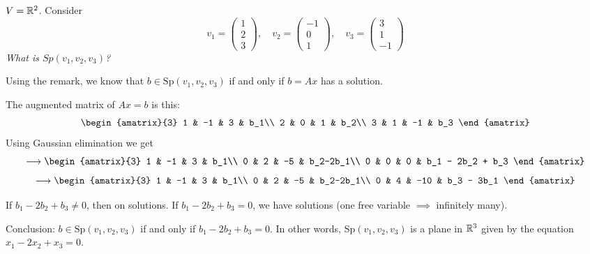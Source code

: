 \documentclass[10pt]{scrartcl}
\begin{document}
\begin{example}
$V = \mathbb{R}^2$. Consider 
\[
  v_1 = \begin{pmatrix}
 1 \\ 2 \\ 3	
 \end{pmatrix},\quad 
 v_2 = \begin{pmatrix}
 -1 \\ 0 \\ 1	
 \end{pmatrix},\quad 
 v_3 = \begin{pmatrix}
 3 \\ 1 \\ -1	
 \end{pmatrix}
\]
\emph{What is $Sp(v_1,v_2,v_3)$?}

Using the remark, we know that $b \in \mathrm{Sp}(v_1,v_2,v_3)$ if and only if $b = Ax$ has a solution. 

The augmented matrix of $Ax = b$ is this: 
\[
\begin{amatrix}{3}
  1 & -1 & 	3 & b_1\\
  2 & 0 & 1 & b_2\\
  3 & 1  & -1 & b_3
  \end{amatrix}
\]
Using Gaussian elimination we get
\[
  \longrightarrow \begin{amatrix}{3}
  	1 & -1 & 3 & b_1\\
  	0 & 2 & -5 & b_2-2b_1\\
  	0 & 0 & 0 & b_1 - 2b_2 + b_3
  \end{amatrix}
\]
\[
    \longrightarrow \begin{amatrix}{3}
  	1 & -1 & 3 & b_1\\
  	0 & 2 & -5 & b_2-2b_1\\
  	0 & 4 & -10 & b_3 - 3b_1
  \end{amatrix}
\]

If $b_1-2b_2 + b_3\neq 0$, then on solutions. If $b_1 - 2b_2 + b_3 = 0$, we have solutions (one free variable $\implies$ infinitely many). 

Conclusion: $b \in \mathrm{Sp}(v_1,v_2,v_3)$ if and only if $b_1 - 2b_2 + b_3 = 0$. In other words, Sp$(v_1,v_2,v_3)$ is a plane in $\mathbb{R}^3$ given by the equation $x_1 - 2x_2 + x_3 = 0$. 
\end{example}\vsp
\end{document}
